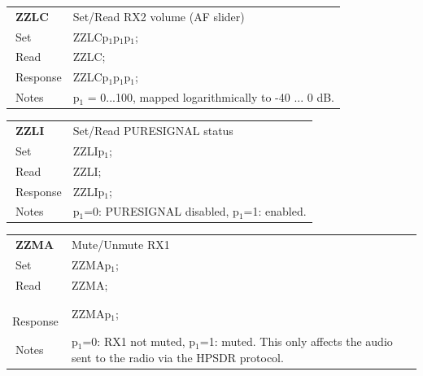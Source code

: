 \documentclass[12pt]{book}
\begin{document}
\begin{center}
\begin{tabular}{|p{2cm}|p{11cm}|}
\toprule
$\phantom{\Big|}$\textbf{\large ZZLC} & Set/Read RX2 volume (AF slider) \\\cline{1-2}
$\phantom{\Big|}${\large Set} & {ZZLCp$_1$p$_1$p$_1$;} \\\hline
$\phantom{\Big|}${\large Read} & {ZZLC;} \\\hline
$\phantom{\Big|}${\large Response} & {ZZLCp$_1$p$_1$p$_1$;} \\\hline
$\phantom{\Big|}${\large Notes} & \multicolumn{1}{|p{11cm}|}{p$_1$ = 0...100, mapped logarithmically to -40 ... 0 dB.} \\
\bottomrule
\end{tabular}
\end{center}

\begin{center}
\begin{tabular}{|p{2cm}|p{11cm}|}
\toprule
$\phantom{\Big|}$\textbf{\large ZZLI} & Set/Read PURESIGNAL status \\\cline{1-2}
$\phantom{\Big|}${\large Set} & {ZZLIp$_1$;} \\\hline
$\phantom{\Big|}${\large Read} & {ZZLI;} \\\hline
$\phantom{\Big|}${\large Response} & {ZZLIp$_1$;} \\\hline
$\phantom{\Big|}${\large Notes} & \multicolumn{1}{|p{11cm}|}{p$_1$=0: PURESIGNAL disabled, p$_1$=1: enabled.} \\
\bottomrule
\end{tabular}
\end{center}

\begin{center}
\begin{tabular}{|p{2cm}|p{11cm}|}
\toprule
$\phantom{\Big|}$\textbf{\large ZZMA} & Mute/Unmute RX1 \\\cline{1-2}
$\phantom{\Big|}${\large Set} & {ZZMAp$_1$;} \\\hline
$\phantom{\Big|}${\large Read} & {ZZMA;} \\\hline
$\phantom{\Big|}${\large Response} & {ZZMAp$_1$;} \\\hline
$\phantom{\Big|}${\large Notes} & \multicolumn{1}{|p{11cm}|}{p$_1$=0: RX1 not muted, p$_1$=1: muted. This only affects the audio sent to the radio via the HPSDR protocol.} \\
\bottomrule
\end{tabular}
\end{center}
\end{document}

